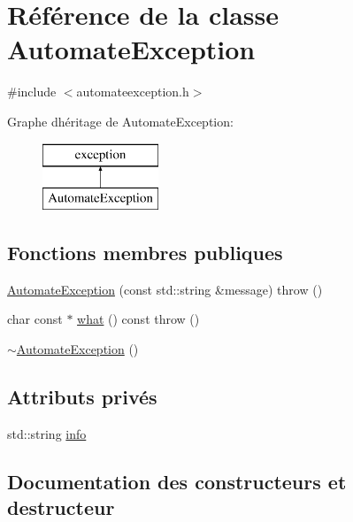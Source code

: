 \hypertarget{class_automate_exception}{}\section{Référence de la classe Automate\+Exception}
\label{class_automate_exception}


{\ttfamily \#include $<$automateexception.\+h$>$}

Graphe d\textquotesingle{}héritage de Automate\+Exception\+:\begin{figure}[H]
\begin{center}
\leavevmode
\includegraphics[height=2.000000cm]{class_automate_exception}
\end{center}
\end{figure}
\subsection*{Fonctions membres publiques}
\begin{DoxyCompactItemize}
\item 
\mbox{\hyperlink{class_automate_exception_a324660f942b04229a4795cc80c3dbe82}{Automate\+Exception}} (const std\+::string \&message)  throw ()
\item 
char const  $\ast$ \mbox{\hyperlink{class_automate_exception_aec651fff04401e5d6eb3ee1804f1afcd}{what}} () const  throw ()
\item 
\mbox{\hyperlink{class_automate_exception_aac1e142017119bf9116fac7cdd6b0a07}{$\sim$\+Automate\+Exception}} ()
\end{DoxyCompactItemize}
\subsection*{Attributs privés}
\begin{DoxyCompactItemize}
\item 
std\+::string \mbox{\hyperlink{class_automate_exception_a016b50d51f7b0ff70ce26394e4004760}{info}}
\end{DoxyCompactItemize}


\subsection{Documentation des constructeurs et destructeur}
\mbox{\label{class_automate_exception_a324660f942b04229a4795cc80c3dbe82}} 
